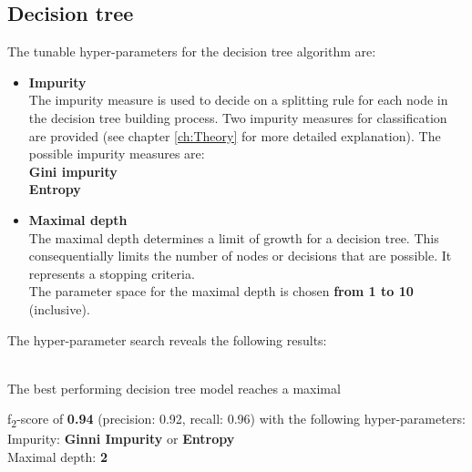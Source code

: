 {{\subsection*{Decision tree}
The tunable hyper-parameters for the decision tree algorithm are:
\begin{itemize}
\item{\textbf{Impurity}}\\
The impurity measure is used to decide on a splitting rule for each node in the decision tree building process.
Two impurity measures for classification are provided (see chapter \ref{ch:Theory} for more detailed explanation).  The possible impurity measures are:\\
\textbf{Gini impurity} \\
\textbf{Entropy}
\item{\textbf{Maximal depth}}\\
The maximal depth determines a limit of growth for a decision tree. This consequentially limits the number of nodes or decisions that are possible. It represents a stopping criteria. \\
The parameter space for the maximal depth is chosen \textbf{from 1 to 10} (inclusive). 
\end{itemize}

The hyper-parameter search reveals the following results: \\

\pgfplotsset{width=1.1\textwidth, height=0.5\textwidth}

\\
The best performing decision tree model reaches a maximal {f\textsubscript{2}-score of \textbf{0.94} (precision:  0.92, recall: 0.96) with the following hyper-parameters:\\
Impurity: \qquad  \qquad \textbf{Ginni Impurity} or \textbf{Entropy} \\
Maximal depth: \qquad \textbf{2}




}}}
